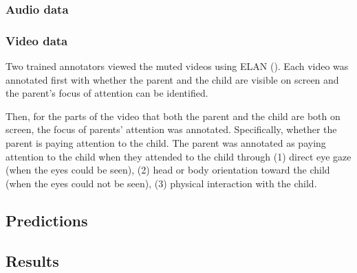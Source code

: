 \label{sec:engsp:corpus:uttgoals}
\subsubsection{Audio data}
\label{sec:engsp:corpus:audio}

\subsubsection{Video data}
\label{sec:engsp:corpus:video}
Two trained annotators viewed the muted videos using ELAN (\cite{elan}). Each video was annotated first with whether the parent and the child are visible on screen and the parent's focus of attention can be identified. 


Then, for the parts of the video that both the parent and the child are both on screen, the focus of parents' attention was annotated. Specifically, whether the parent is paying attention to the child. The parent was annotated as paying attention to the child when they attended to the child through (1) direct eye gaze (when the eyes could be seen), (2) head or body orientation toward the child (when the eyes could not be seen), (3) physical interaction with the child.  


\subsection{Predictions}
\label{sec:engsp:predictions}

\subsection{Results}
\label{sec:engsp:results}



